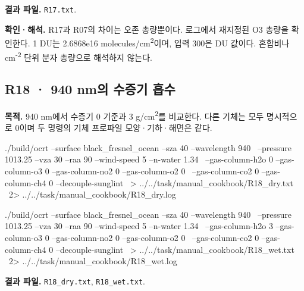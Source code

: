 \textbf{결과 파일. }\texttt{R17.txt}.

\textbf{확인·해석. }R17과 R07의 차이는 오존 총량뿐이다. 로그에서 재지정된 O3 총량을 확인한다. 1 DU는 2.6868e16 molecules/cm\textsuperscript{2}이며, 입력 300은 DU 값이다. 혼합비나 cm\textsuperscript{-2} 단위 분자 총량으로 해석하지 않는다.


\subsection{R18 · 940 nm의 수증기 흡수}
\label{sec:auto:09_cookbook:4.3}

\label{recipe:R18}

\textbf{목적. }940 nm에서 수증기 0 기준과 3 g/cm\textsuperscript{2}를 비교한다. 다른 기체는 모두 명시적으로 0이며 두 명령의 기체 프로파일 모양·기하·해면은 같다.

\noindent\begin{minipage}{\linewidth}
\begin{ManualCode}

./build/ocrt --surface black_fresnel_ocean --sza 40 --wavelength 940 \
  --pressure 1013.25 --vza 30 --raa 90 --wind-speed 5 --n-water 1.34 \
  --gas-column-h2o 0 --gas-column-o3 0 --gas-column-no2 0 --gas-column-o2 0 \
  --gas-column-co2 0 --gas-column-ch4 0 --decouple-sunglint \
  > ../../task/manual_cookbook/R18_dry.txt \
  2> ../../task/manual_cookbook/R18_dry.log

\end{ManualCode}
\end{minipage}\par

\noindent\begin{minipage}{\linewidth}
\begin{ManualCode}

./build/ocrt --surface black_fresnel_ocean --sza 40 --wavelength 940 \
  --pressure 1013.25 --vza 30 --raa 90 --wind-speed 5 --n-water 1.34 \
  --gas-column-h2o 3 --gas-column-o3 0 --gas-column-no2 0 --gas-column-o2 0 \
  --gas-column-co2 0 --gas-column-ch4 0 --decouple-sunglint \
  > ../../task/manual_cookbook/R18_wet.txt \
  2> ../../task/manual_cookbook/R18_wet.log

\end{ManualCode}
\end{minipage}\par

\textbf{결과 파일. }\texttt{R18\_\allowbreak{}dry.txt}, \texttt{R18\_\allowbreak{}wet.txt}.

